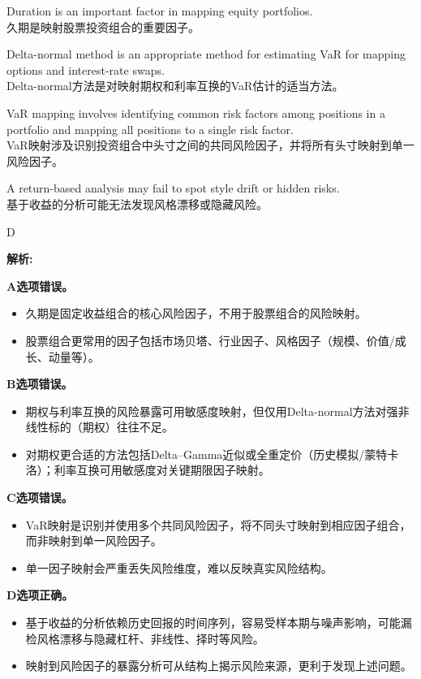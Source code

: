 \documentclass{article}
\newenvironment{explanation}
{\textbf{解析:}\par}
{\par}
\begin{document}
\begin{choices}
    \item Duration is an important factor in mapping equity portfolios.\\
        久期是映射股票投资组合的重要因子。
    \item Delta-normal method is an appropriate method for estimating VaR for mapping options and interest-rate swaps.\\
        Delta-normal方法是对映射期权和利率互换的VaR估计的适当方法。
    \item VaR mapping involves identifying common risk factors among positions in a portfolio and mapping all positions to a single risk factor.\\
        VaR映射涉及识别投资组合中头寸之间的共同风险因子，并将所有头寸映射到单一风险因子。
    \item A return-based analysis may fail to spot style drift or hidden risks.\\
        基于收益的分析可能无法发现风格漂移或隐藏风险。
\end{choices}

\begin{correctanswer}
    D
\end{correctanswer}

\begin{explanation}

    \textbf{A选项错误。}
    \begin{itemize}
        \item 久期是固定收益组合的核心风险因子，不用于股票组合的风险映射。
        \item 股票组合更常用的因子包括市场贝塔、行业因子、风格因子（规模、价值/成长、动量等）。
    \end{itemize}

    \textbf{B选项错误。}
    \begin{itemize}
        \item 期权与利率互换的风险暴露可用敏感度映射，但仅用Delta-normal方法对强非线性标的（期权）往往不足。
        \item 对期权更合适的方法包括Delta–Gamma近似或全重定价（历史模拟/蒙特卡洛）；利率互换可用敏感度对关键期限因子映射。
    \end{itemize}

    \textbf{C选项错误。}
    \begin{itemize}
        \item VaR映射是识别并使用多个共同风险因子，将不同头寸映射到相应因子组合，而非映射到单一风险因子。
        \item 单一因子映射会严重丢失风险维度，难以反映真实风险结构。
    \end{itemize}

    \textbf{D选项正确。}
    \begin{itemize}
        \item 基于收益的分析依赖历史回报的时间序列，容易受样本期与噪声影响，可能漏检风格漂移与隐藏杠杆、非线性、择时等风险。
        \item 映射到风险因子的暴露分析可从结构上揭示风险来源，更利于发现上述问题。
    \end{itemize}

\end{explanation}
\end{document}
